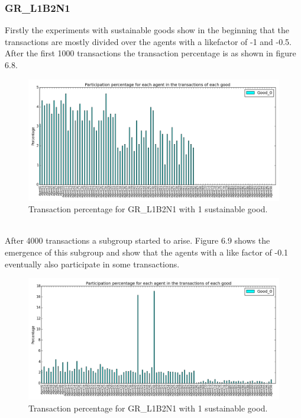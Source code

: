 \documentclass[twoside,openright]{uva-bachelor-thesis}
\begin{document}
\subsubsection{GR\_L1B2N1}
Firstly the experiments with sustainable goods show in the beginning that the transactions are mostly divided over the agents with a likefactor of -1 and -0.5. After the first 1000 transactions the transaction percentage is as shown in figure 6.8. \\
\begin{figure}[h!]
  \centering
   \includegraphics[scale=0.4]{Simulation2_figures/GR_L1B2N1/Figure1_1good_1k}
  \caption{Transaction percentage for GR\_L1B2N1 with 1 sustainable good.}
\end{figure}
 \\
After 4000 transactions a subgroup started to arise. Figure 6.9 shows the emergence of this subgroup and show that the agents with a like factor of -0.1 eventually also participate in some transactions. \\
\begin{figure}[h!]
  \centering
  \includegraphics[scale=0.4]{Simulation2_figures/GR_L1B2N1/Figure2_1good_4k} 
  \caption{Transaction percentage for GR\_L1B2N1 with 1 sustainable good.}
\end{figure}
\\
\end{document}

